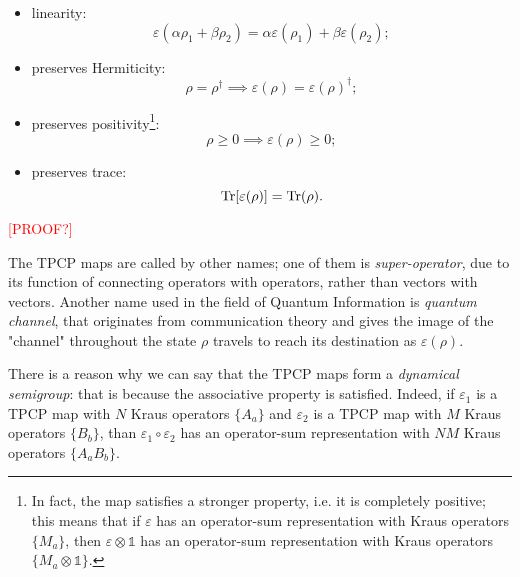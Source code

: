 \begin{itemize}
    \item linearity: 
    \begin{equation*}
        \varepsilon(\alpha\rho_1 + \beta\rho_2) = \alpha\varepsilon(\rho_1) + \beta\varepsilon(\rho_2);
    \end{equation*}
    \item preserves Hermiticity: 
    \begin{equation*}
        \rho = \rho^\dagger \implies \varepsilon(\rho) = \varepsilon(\rho)^\dagger;
    \end{equation*}
    \item preserves positivity\footnote{In fact, the map satisfies a stronger property, i.e. it is completely positive; this means that if $\varepsilon$ has an operator-sum representation with Kraus operators $\{M_a\}$, then $\varepsilon \otimes \mathds{1}$ has an operator-sum representation with Kraus operators $\{M_a \otimes \mathds{1}\}$.}:
    \begin{equation*}
        \rho \geq 0 \implies \varepsilon(\rho) \geq 0;
    \end{equation*}
    \item preserves trace:
    \begin{equation*}
        \operatorname{Tr} [\varepsilon(\rho)] = \operatorname{Tr} (\rho).
    \end{equation*}
\end{itemize}
\textcolor{red}{[PROOF?]}

The TPCP maps are called by other names; one of them is \emph{super-operator}, due to its function of connecting operators with operators, rather than vectors with vectors. Another name used in the field of Quantum Information is \emph{quantum channel}, that originates from communication theory and gives the image of the "channel" throughout the state $\rho$ travels to reach its destination as $\varepsilon(\rho)$.

There is a reason why we can say that the TPCP maps form a \emph{dynamical semigroup}: that is because the associative property is satisfied. Indeed, if $\varepsilon_1$ is a TPCP map with $N$ Kraus operators $\{A_a\}$ and $\varepsilon_2$ is a TPCP map with $M$ Kraus operators $\{B_b\}$, than $\varepsilon_1 \circ \varepsilon_2$ has an operator-sum representation with $NM$ Kraus operators $\{A_aB_b\}$.

